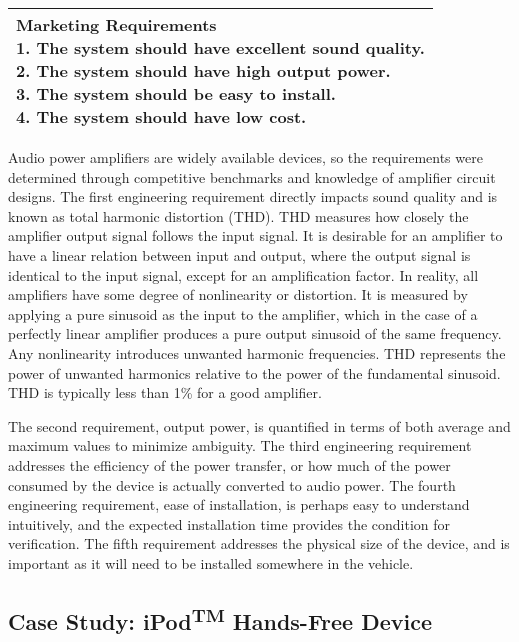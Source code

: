 \begin{table}
\begin{tabular}{ |p{2cm}|p{5cm}|p{5cm}|}
\multicolumn{3}{|p{12cm}|}{
\textbf{Marketing Requirements}\newline
1.  The system should have excellent sound quality.\newline
2.  The system should have high output power.\newline
3.  The system should be easy to install.\newline
4.   The system should have low cost.
} \\ \hline
\end{tabular}
\end{table}

Audio power amplifiers are widely available devices, so the requirements
were determined through competitive benchmarks and knowledge of
amplifier circuit designs. The first engineering requirement directly
impacts sound quality and is known as total harmonic distortion (THD).
THD measures how closely the amplifier output signal follows the input
signal. It is desirable for an amplifier to have a linear relation
between input and output, where the output signal is identical to the
input signal, except for an amplification factor. In reality, all
amplifiers have some degree of nonlinearity or distortion. It is
measured by applying a pure sinusoid as the input to the amplifier,
which in the case of a perfectly linear amplifier produces a pure output
sinusoid of the same frequency. Any nonlinearity introduces unwanted
harmonic frequencies. THD represents the power of unwanted harmonics
relative to the power of the fundamental sinusoid. THD is typically less
than 1\% for a good amplifier.

The second requirement, output power, is quantified in terms of both
average and maximum values to minimize ambiguity. The third engineering
requirement addresses the efficiency of the power transfer, or how much
of the power consumed by the device is actually converted to audio
power. The fourth engineering requirement, ease of installation, is
perhaps easy to understand intuitively, and the expected installation
time provides the condition for verification. The fifth requirement
addresses the physical size of the device, and is important as it will
need to be installed somewhere in the vehicle.

\subsection{Case Study: iPod\textsuperscript{TM} Hands-Free Device}
\label{subsection:case-study-ipodtm-hands-free-device}


